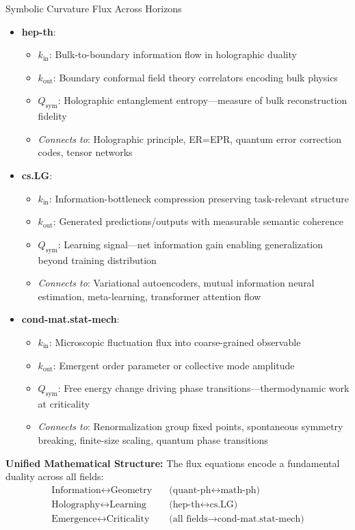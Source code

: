 \begin{scholium}{Symbolic Curvature Flux Across Horizons}
\begin{itemize}
\item \textbf{hep-th}:
  \begin{itemize}
  \item $k_{\text{in}}$: Bulk-to-boundary information flow in holographic duality
  \item $k_{\text{out}}$: Boundary conformal field theory correlators encoding bulk physics
  \item $Q_{\text{sym}}$: Holographic entanglement entropy—measure of bulk reconstruction fidelity
  \item \textit{Connects to}: Holographic principle, ER=EPR, quantum error correction codes, tensor networks
  \end{itemize}

\item \textbf{cs.LG}:
  \begin{itemize}
  \item $k_{\text{in}}$: Information-bottleneck compression preserving task-relevant structure
  \item $k_{\text{out}}$: Generated predictions/outputs with measurable semantic coherence
  \item $Q_{\text{sym}}$: Learning signal—net information gain enabling generalization beyond training distribution
  \item \textit{Connects to}: Variational autoencoders, mutual information neural estimation, meta-learning, transformer attention flow
  \end{itemize}

\item \textbf{cond-mat.stat-mech}:
  \begin{itemize}
  \item $k_{\text{in}}$: Microscopic fluctuation flux into coarse-grained observable
  \item $k_{\text{out}}$: Emergent order parameter or collective mode amplitude
  \item $Q_{\text{sym}}$: Free energy change driving phase transitions—thermodynamic work at criticality
  \item \textit{Connects to}: Renormalization group fixed points, spontaneous symmetry breaking, finite-size scaling, quantum phase transitions
  \end{itemize}
\end{itemize}

\textbf{Unified Mathematical Structure:}
The flux equations encode a fundamental duality across all fields:
\begin{align}
\text{Information} \leftrightarrow \text{Geometry} &\quad \text{(quant-ph} \leftrightarrow \text{math-ph)} \\
\text{Holography} \leftrightarrow \text{Learning} &\quad \text{(hep-th} \leftrightarrow \text{cs.LG)} \\
\text{Emergence} \leftrightarrow \text{Criticality} &\quad \text{(all fields} \rightarrow \text{cond-mat.stat-mech)}
\end{align}


\end{scholium}

